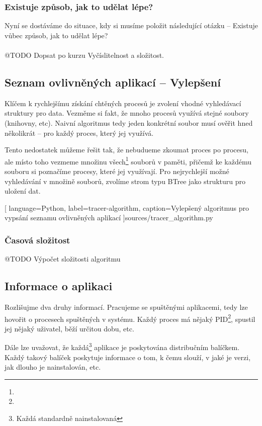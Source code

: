 \documentclass[10pt,a4paper]{article}
\begin{document}

			\subsubsection*{Existuje způsob, jak to udělat lépe?}
			Nyní se dostáváme do situace, kdy si musíme položit následující otázku -- Existuje vůbec způsob, jak to udělat lépe?
			\\
			\\
			@TODO Dopsat po kurzu Vyčíslitelnost a složitost.

		\subsection{Seznam ovlivněných aplikací -- Vylepšení}
		Klíčem k rychlejšímu získání chtěných procesů je zvolení vhodné vyhledávací struktury pro data. Vezměme si fakt, že mnoho procesů využívá stejné soubory (knihovny, etc). Naivní algoritmus tedy jeden konkrétní soubor musí ověřit hned několikrát -- pro každý proces, který jej využívá.

		Tento nedostatek můžeme řešit tak, že nebudueme zkoumat proces po procesu, ale místo toho vezmeme množinu všech\footnote{} souborů v paměti, přičemž ke každému souboru si poznačíme procesy, které jej využívají. Pro nejrychlejší možné vyhledávání v množině souborů, zvolíme strom typu BTree jako strukturu pro uložení dat.

		
		[
			language={Python},
			label=tracer-algorithm,
			caption={Vylepšený algoritmus pro vypsání seznamu ovlivněných aplikací}
		]{sources/tracer_algorithm.py}

			\subsubsection*{Časová složitost}
			@TODO Výpočet složitosti algoritmu

		\subsection{Informace o aplikaci}
		Rozlišujme dva druhy informací. Pracujeme se spuštěnými aplikacemi, tedy lze hovořit o procesech spuštěných v systému. Každý proces má nějaký PID\footnote{}, spustil jej nějaký uživatel, běží určitou dobu, etc.

		Dále lze uvažovat, že každá\footnote{Každá standardně nainstalovaná} aplikace je poskytována distribučním balíčkem. Každý takový balíček poskytuje informace o tom, k čemu slouží, v jaké je verzi, jak dlouho je nainstalován, etc.
\end{document}
